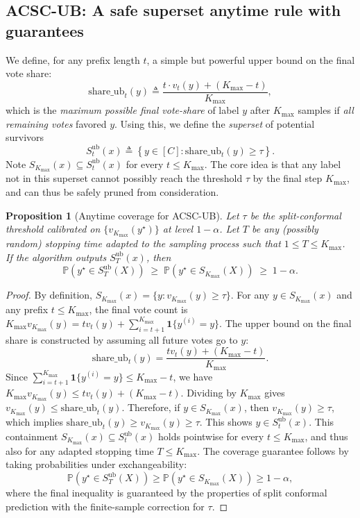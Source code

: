 \documentclass[11pt]{article}
\newtheorem{proposition}{Proposition}
\begin{document}
\subsection{ACSC-UB: A safe superset anytime rule with guarantees}
We define, for any prefix length $t$, a simple but powerful upper bound on the final vote share:
\[
\text{share\_ub}_t(y) \triangleq \frac{t \cdot v_t(y) + (K_{\max} - t)}{K_{\max}},
\]
which is the \emph{maximum possible final vote-share} of label $y$ after $K_{\max}$ samples if \emph{all remaining votes} favored $y$. Using this, we define the \emph{superset} of potential survivors
\[
S^{\text{ub}}_t(x) \triangleq \left\{ y \in [C] : \text{share\_ub}_t(y) \ge \tau \right\}.
\]
Note $S_{K_{\max}}(x) \subseteq S^{\text{ub}}_t(x)$ for every $t \le K_{\max}$. The core idea is that any label not in this superset cannot possibly reach the threshold $\tau$ by the final step $K_{\max}$, and can thus be safely pruned from consideration.

\begin{proposition}[Anytime coverage for ACSC-UB]
Let $\tau$ be the split-conformal threshold calibrated on $\{v_{K_{\max}}(y^\star)\}$ at level $1-\alpha$.
Let $T$ be any (possibly random) stopping time adapted to the sampling process such that $1 \le T \le K_{\max}$.
If the algorithm outputs $S^{\text{ub}}_T(x)$, then
\[
\mathbb{P}\left(y^\star \in S^{\text{ub}}_T(X)\right) \;\ge\; \mathbb{P}\left(y^\star \in S_{K_{\max}}(X)\right) \;\ge\; 1-\alpha.
\]
\end{proposition}

\begin{proof}
By definition, $S_{K_{\max}}(x) = \{y : v_{K_{\max}}(y) \ge \tau\}$. For any $y \in S_{K_{\max}}(x)$ and any prefix $t \le K_{\max}$, the final vote count is $K_{\max} v_{K_{\max}}(y) = t v_t(y) + \sum_{i=t+1}^{K_{\max}} \mathbf{1}\{y^{(i)}=y\}$. The upper bound on the final share is constructed by assuming all future votes go to $y$:
\[
\text{share\_ub}_t(y) = \frac{t v_t(y) + (K_{\max}-t)}{K_{\max}}.
\]
Since $\sum_{i=t+1}^{K_{\max}} \mathbf{1}\{y^{(i)}=y\} \le K_{\max}-t$, we have $K_{\max} v_{K_{\max}}(y) \le t v_t(y) + (K_{\max}-t)$. Dividing by $K_{\max}$ gives $v_{K_{\max}}(y) \le \text{share\_ub}_t(y)$.
Therefore, if $y \in S_{K_{\max}}(x)$, then $v_{K_{\max}}(y) \ge \tau$, which implies $\text{share\_ub}_t(y) \ge v_{K_{\max}}(y) \ge \tau$.
This shows $y \in S^{\text{ub}}_t(x)$.
This containment $S_{K_{\max}}(x) \subseteq S^{\text{ub}}_t(x)$ holds pointwise for every $t \le K_{\max}$, and thus also for any adapted stopping time $T \le K_{\max}$. The coverage guarantee follows by taking probabilities under exchangeability:
\[
\mathbb{P}(y^\star \in S^{\text{ub}}_T(X)) \ge \mathbb{P}(y^\star \in S_{K_{\max}}(X)) \ge 1-\alpha,
\]
where the final inequality is guaranteed by the properties of split conformal prediction with the finite-sample correction for $\tau$.
\end{proof}
\end{document}
